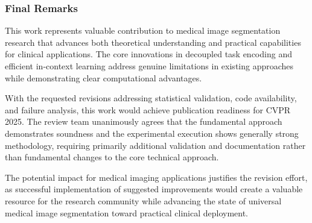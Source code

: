 \subsubsection{Final Remarks}
This work represents valuable contribution to medical image segmentation research that advances both theoretical understanding and practical capabilities for clinical applications. The core innovations in decoupled task encoding and efficient in-context learning address genuine limitations in existing approaches while demonstrating clear computational advantages.

With the requested revisions addressing statistical validation, code availability, and failure analysis, this work would achieve publication readiness for CVPR 2025. The review team unanimously agrees that the fundamental approach demonstrates soundness and the experimental execution shows generally strong methodology, requiring primarily additional validation and documentation rather than fundamental changes to the core technical approach.

The potential impact for medical imaging applications justifies the revision effort, as successful implementation of suggested improvements would create a valuable resource for the research community while advancing the state of universal medical image segmentation toward practical clinical deployment.
